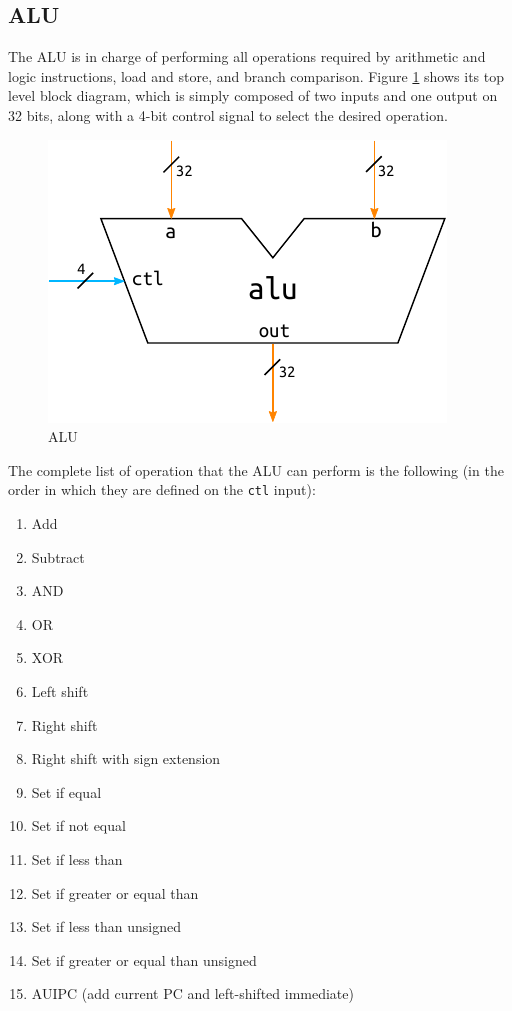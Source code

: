 \documentclass[a4paper]{article}
\begin{document}
\subsection{ALU}
The ALU is in charge of performing all operations required by arithmetic and logic instructions, load and store, and branch comparison. Figure \ref{fig:alu} shows its top level block diagram, which is simply composed of two inputs and one output on 32 bits, along with a 4-bit control signal to select the desired operation.

\begin{figure}[hbtp]
    \centering
    \includegraphics[]{../alu/ref/schematic/alu.pdf}
    \caption{ALU}
    \label{fig:alu}
\end{figure}

The complete list of operation that the ALU can perform is the following (in the order in which they are defined on the \texttt{ctl} input):
\begin{enumerate}
    \item Add
    \item Subtract
    \item AND
    \item OR
    \item XOR
    \item Left shift
    \item Right shift
    \item Right shift with sign extension
    \item Set if equal
    \item Set if not equal
    \item Set if less than
    \item Set if greater or equal than
    \item Set if less than unsigned
    \item Set if greater or equal than unsigned
    \item AUIPC (add current PC and left-shifted immediate)
\end{enumerate}
\end{document}
